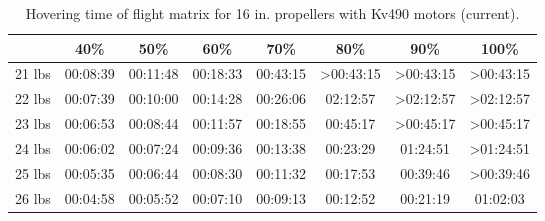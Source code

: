 \documentclass{article}
\begin{document}
\begin{table}[h]
    \centering
    \begin{tabular}{|c|c|c|c|c|c|c|c|}
        \hline
 & 40\% & 50\% & 60\% & 70\% & 80\% & 90\% & 100\%  \\
        \hline
        21 lbs & \cellcolor{red!80} 00:08:39 & \cellcolor{red!80} 00:11:48 & \cellcolor{red!80} 00:18:33 & \cellcolor{red!80} 00:43:15 & \cellcolor{ForestGreen!80} >00:43:15 & \cellcolor{ForestGreen!80} >00:43:15 & \cellcolor{ForestGreen!80} >00:43:15 \\
        \hline
        22 lbs & \cellcolor{red!80} 00:07:39 & \cellcolor{red!80} 00:10:00 & \cellcolor{red!80} 00:14:28 & \cellcolor{red!80} 00:26:06 & \cellcolor{red!80} 02:12:57 & \cellcolor{ForestGreen!80} >02:12:57 & \cellcolor{ForestGreen!80} >02:12:57 \\
        \hline
        23 lbs & \cellcolor{red!80} 00:06:53 & \cellcolor{red!80} 00:08:44 & \cellcolor{red!80} 00:11:57 & \cellcolor{red!80} 00:18:55 & \cellcolor{red!80} 00:45:17 & \cellcolor{ForestGreen!80} >00:45:17 & \cellcolor{ForestGreen!80} >00:45:17 \\
        \hline
        24 lbs & \cellcolor{red!80} 00:06:02 & \cellcolor{red!80} 00:07:24 & \cellcolor{red!80} 00:09:36 & \cellcolor{red!80} 00:13:38 & \cellcolor{red!80} 00:23:29 & \cellcolor{red!80} 01:24:51 & \cellcolor{ForestGreen!80} >01:24:51 \\
        \hline
        25 lbs & \cellcolor{red!80} 00:05:35 & \cellcolor{red!80} 00:06:44 & \cellcolor{red!80} 00:08:30 & \cellcolor{red!80} 00:11:32 & \cellcolor{red!80} 00:17:53 & \cellcolor{red!80} 00:39:46 & \cellcolor{ForestGreen!80} >00:39:46 \\
        \hline
        26 lbs & \cellcolor{red!80} 00:04:58 & \cellcolor{red!80} 00:05:52 & \cellcolor{red!80} 00:07:10 & \cellcolor{red!80} 00:09:13 & \cellcolor{red!80} 00:12:52 & \cellcolor{red!80} 00:21:19 & \cellcolor{red!80} 01:02:03 \\
        \hline
    \end{tabular}
    \caption{Hovering time of flight matrix for 16 in. propellers with Kv490 motors (current).}
    \label{tab:hover_ToF_matrix_16}
\end{table}
\end{document}
